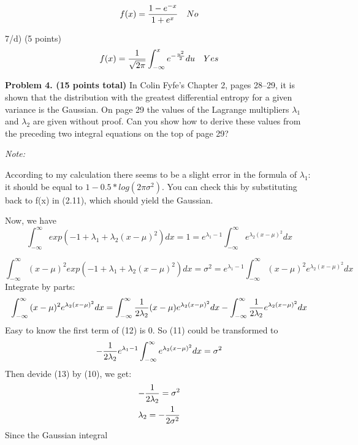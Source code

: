 \documentclass[epsfig]{article}
\def\bpar{\vskip26pt}
\def\npar{\vskip13pt}
\def\spar{\vskip10pt}
\begin{document}
\begin{equation}
f(x) = {1 - e^{-x} \over 1 + e^x}    \quad No
\end{equation}

\npar 
7/d) (5 points)
\begin{equation}
f(x) = {1 \over \sqrt{2\pi}} \int_{-\infty}^x {e^{-{u^2 \over 2}}} du  \quad Yes
\end{equation}






\bpar
{\bf Problem 4. (15 points total)}
\spar
In Colin Fyfe's Chapter 2, pages 28--29, it is shown that the distribution with the greatest differential entropy for a given variance is the Gaussian. On page 29 the values of the Lagrange multipliers $\lambda_1$ and $\lambda_2$ are given without proof. Can you show how to derive these values from the preceding two integral equations on the top of page 29? 
\spar
{\sl Note: 

According to my calculation there seems to be a slight error in the formula of $\lambda_1$: it should be equal to $1-0.5*log(2\pi\sigma^2)$. You can check this by substituting back to f(x) in (2.11), which should yield the Gaussian.}
\spar\centerline{\underline{}}
Now, we have
\begin{equation}
\int_{-\infty}^\infty {exp(-1+\lambda_1+\lambda_2(x-\mu)^2)} dx=1=e^{\lambda_1-1}\int_{-\infty}^\infty {e^{\lambda_2(x-\mu)^2}}dx
\end{equation}

\begin{equation}
\int_{-\infty}^\infty {(x-\mu)^2 exp(-1+\lambda_1+\lambda_2(x-\mu)^2)} dx=\sigma^2=e^{\lambda_1-1}\int_{-\infty}^\infty {(x-\mu)^2e^{\lambda_2(x-\mu)^2}}dx
\end{equation}
Integrate by parts:
\begin{equation}
\int_{-\infty}^\infty {(x-\mu)^2e^{\lambda_2(x-\mu)^2}}dx=\int_{-\infty}^\infty {{1\over{2\lambda_2}}(x-\mu)e^{\lambda_2(x-\mu)^2}}dx-\int_{-\infty}^\infty {{1\over{2\lambda_2}}e^{\lambda_2(x-\mu)^2}}dx
\end{equation}
Easy to know the first term of (12) is 0. So (11) could be transformed to
\begin{equation}
-{1\over{2\lambda_2}}e^{\lambda_1-1}\int_{-\infty}^\infty {e^{\lambda_2(x-\mu)^2}}dx= \sigma^2
\end{equation}
Then devide (13) by (10), we get:
\begin{gather}
-{1\over{2\lambda_2}}=\sigma^2\\
\lambda_2=-{1\over{2\sigma^2}}
\end{gather}
Since the Gaussian integral
\end{document}
